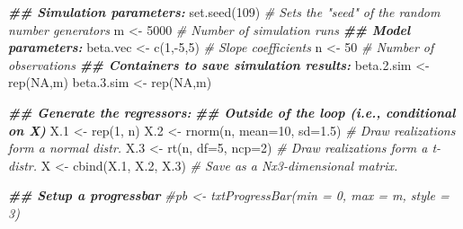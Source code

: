 \documentclass[
]{book}
\newenvironment{Shaded}{\begin{snugshade}}{\end{snugshade}}
\newcommand{\AttributeTok}[1]{\textcolor[rgb]{0.77,0.63,0.00}{#1}}
\newcommand{\CommentTok}[1]{\textcolor[rgb]{0.56,0.35,0.01}{\textit{#1}}}
\newcommand{\ConstantTok}[1]{\textcolor[rgb]{0.00,0.00,0.00}{#1}}
\newcommand{\DecValTok}[1]{\textcolor[rgb]{0.00,0.00,0.81}{#1}}
\newcommand{\DocumentationTok}[1]{\textcolor[rgb]{0.56,0.35,0.01}{\textbf{\textit{#1}}}}
\newcommand{\FloatTok}[1]{\textcolor[rgb]{0.00,0.00,0.81}{#1}}
\newcommand{\FunctionTok}[1]{\textcolor[rgb]{0.00,0.00,0.00}{#1}}
\newcommand{\NormalTok}[1]{#1}
\newcommand{\OtherTok}[1]{\textcolor[rgb]{0.56,0.35,0.01}{#1}}
\newcommand{\SpecialCharTok}[1]{\textcolor[rgb]{0.00,0.00,0.00}{#1}}
\begin{document}
\begin{Shaded}
\begin{Highlighting}[]
\DocumentationTok{\#\# Simulation parameters:}
\FunctionTok{set.seed}\NormalTok{(}\DecValTok{109}\NormalTok{)            }\CommentTok{\# Sets the "seed" of the random number generators}
\NormalTok{m           }\OtherTok{\textless{}{-}} \DecValTok{5000}      \CommentTok{\# Number of simulation runs}
\DocumentationTok{\#\# Model parameters:}
\NormalTok{beta.vec    }\OtherTok{\textless{}{-}} \FunctionTok{c}\NormalTok{(}\DecValTok{1}\NormalTok{,}\SpecialCharTok{{-}}\DecValTok{5}\NormalTok{,}\DecValTok{5}\NormalTok{) }\CommentTok{\# Slope coefficients}
\NormalTok{n           }\OtherTok{\textless{}{-}} \DecValTok{50}        \CommentTok{\# Number of observations}
\DocumentationTok{\#\# Containers to save simulation results:}
\NormalTok{beta.}\FloatTok{2.}\NormalTok{sim  }\OtherTok{\textless{}{-}} \FunctionTok{rep}\NormalTok{(}\ConstantTok{NA}\NormalTok{,m) }
\NormalTok{beta.}\FloatTok{3.}\NormalTok{sim  }\OtherTok{\textless{}{-}} \FunctionTok{rep}\NormalTok{(}\ConstantTok{NA}\NormalTok{,m) }

\DocumentationTok{\#\# Generate the regressors: }
\DocumentationTok{\#\# Outside of the loop (i.e., \textquotesingle{}conditional on X\textquotesingle{})}
\NormalTok{X}\FloatTok{.1} \OtherTok{\textless{}{-}} \FunctionTok{rep}\NormalTok{(}\DecValTok{1}\NormalTok{, n)}
\NormalTok{X}\FloatTok{.2} \OtherTok{\textless{}{-}} \FunctionTok{rnorm}\NormalTok{(n, }\AttributeTok{mean=}\DecValTok{10}\NormalTok{, }\AttributeTok{sd=}\FloatTok{1.5}\NormalTok{)    }\CommentTok{\# Draw realizations form a normal distr.}
\NormalTok{X}\FloatTok{.3} \OtherTok{\textless{}{-}} \FunctionTok{rt}\NormalTok{(n, }\AttributeTok{df=}\DecValTok{5}\NormalTok{, }\AttributeTok{ncp=}\DecValTok{2}\NormalTok{)           }\CommentTok{\# Draw realizations form a t{-}distr.}
\NormalTok{X   }\OtherTok{\textless{}{-}} \FunctionTok{cbind}\NormalTok{(X}\FloatTok{.1}\NormalTok{, X}\FloatTok{.2}\NormalTok{, X}\FloatTok{.3}\NormalTok{)         }\CommentTok{\# Save as a Nx3{-}dimensional matrix.}

\DocumentationTok{\#\# Setup a progressbar}
\CommentTok{\#pb \textless{}{-} txtProgressBar(min = 0, max = m, style = 3)}


\end{Highlighting}
\end{Shaded}
\end{document}
